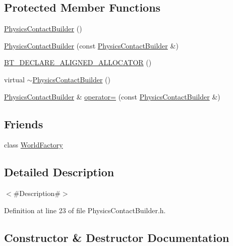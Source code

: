 \subsection*{Protected Member Functions}
\begin{DoxyCompactItemize}
\item 
\mbox{\hyperlink{classnjli_1_1_physics_contact_builder_ad209941717768086727443fd39968c7b}{Physics\+Contact\+Builder}} ()
\item 
\mbox{\hyperlink{classnjli_1_1_physics_contact_builder_aa3d78f8ae98c34f524193dd22699bc47}{Physics\+Contact\+Builder}} (const \mbox{\hyperlink{classnjli_1_1_physics_contact_builder}{Physics\+Contact\+Builder}} \&)
\item 
\mbox{\hyperlink{classnjli_1_1_physics_contact_builder_a95e94b2fd50cbd2ae7fdea2c617a57a0}{B\+T\+\_\+\+D\+E\+C\+L\+A\+R\+E\+\_\+\+A\+L\+I\+G\+N\+E\+D\+\_\+\+A\+L\+L\+O\+C\+A\+T\+OR}} ()
\item 
virtual \mbox{\hyperlink{classnjli_1_1_physics_contact_builder_aff0a728e0125ac2debb1af7e1e7ae1d6}{$\sim$\+Physics\+Contact\+Builder}} ()
\item 
\mbox{\hyperlink{classnjli_1_1_physics_contact_builder}{Physics\+Contact\+Builder}} \& \mbox{\hyperlink{classnjli_1_1_physics_contact_builder_af1319899b50158cd3669cb538a324049}{operator=}} (const \mbox{\hyperlink{classnjli_1_1_physics_contact_builder}{Physics\+Contact\+Builder}} \&)
\end{DoxyCompactItemize}
\subsection*{Friends}
\begin{DoxyCompactItemize}
\item 
class \mbox{\hyperlink{classnjli_1_1_physics_contact_builder_acb96ebb09abe8f2a37a915a842babfac}{World\+Factory}}
\end{DoxyCompactItemize}


\subsection{Detailed Description}
$<$\#\+Description\#$>$ 

Definition at line 23 of file Physics\+Contact\+Builder.\+h.



\subsection{Constructor \& Destructor Documentation}
\mbox{\label{classnjli_1_1_physics_contact_builder_ad209941717768086727443fd39968c7b}} 
